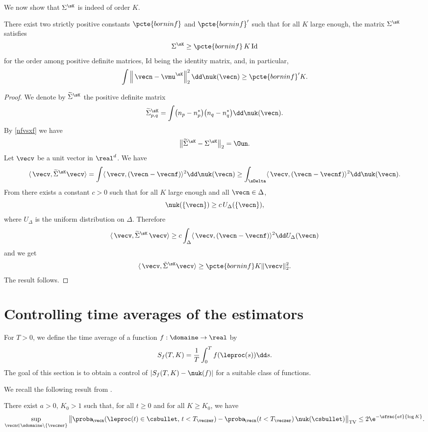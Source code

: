 We now show that $\Sigma^{\sK}$ is indeed of order $K$.
\begin{proposition}\label{borninf}
There exist two strictly positive constants $\pcte{borninf}$ and $\pcte{borninf}'$ such that for all $K$ large enough, the matrix $\Sigma^{\sK}$ satisfies
\[
\Sigma^{\sK}\ge \pcte{borninf} \, K \, \mathrm{Id}
\]
for the order among positive definite matrices, $\mathrm{Id}$ being the identity matrix, and, in particular,
\[
\int \left\|\,\vecn-\vmu^{\sK}\right\|_{2}^2\dd\nuk(\vecn)
\geq \pcte{borninf}' K.
\]
\end{proposition}
\begin{proof}
We denote by $\widetilde\Sigma^{\sK}$ the positive definite matrix
\[
\widetilde\Sigma^{\sK}_{p,q}= \int \bigl(n_{p}-n_{p}^*\bigr)
\bigl(n_{q}-n_{q}^*\bigr)\dd\nuk(\vecn).
\]
By \eqref{nfvsxf} we have
\begin{equation}\label{comparaisondescov}
\big\|\widetilde\Sigma^{\sK}-\Sigma^{\sK}\big\|_{2}=\Oun.
\end{equation}
Let $\vecv$ be a unit vector in $\real^{d}$. We have
\[
\langle\, \vecv,\widetilde\Sigma^{\sK}\vecv\rangle=
\int \langle\, \vecv,(\vecn-\vecnf)\rangle^2\dd\nuk(\vecn)\ge
\int_{\sDelta}\langle\, \vecv,(\vecn-\vecnf)\rangle^2\dd\nuk(\vecn).
\]
From \cite[Lem.\,5.3]{ccm2} there exists a constant $c>0$ such that for all $K$ large enough and all $\vecn\in \Delta$,
\[
{\nuk}(\{\vecn\})\geq c\, U_{\Delta}(\{\vecn\}),
\]
where $U_{\Delta}$ is the uniform distribution on $\Delta$.
Therefore
\[
\langle\, \vecv, \widetilde\Sigma^{\sK}\,\vecv\rangle\ge
c \int_{\Delta} \langle\, \vecv,(\vecn-\vecnf)\rangle^2
\dd U_{\Delta}(\vecn)
\]
and we get
\[
\langle\, \vecv,\tilde\Sigma^{\sK}\vecv\rangle\geq \pcte{borninf} K\|\vecv\|_{2}^2.
\]
The result follows.
\end{proof}

\section{Controlling time averages of the estimators}
\label{sec:process}

For $T>0$, we define the time average of a function $f:\domaine\to\real$ by
\begin{equation}
\label{statf}
S_{f}(T,K)=\frac{1}{T}\int_{0}^{T}f(\leproc(s)) \dd s.
\end{equation}
The goal of this section is to obtain a control of $|S_{f}(T,K)-\nuk(f)|$ for a suitable class of functions.

We recall the following result from \cite[Th.\,3.1]{ccm2}.
\begin{theorem}\label{decor-thm}
There exist $a>0$, $K_0>1$ such that, for all
$t\geq 0$ and for all $K\geq K_0$, we have
\begin{equation}\label{decor}
\sup_{\vecn\in\sdomaine\backslash\{\veczer\}}
\big\| \proba\!_{\vecn}(\leproc(t)\in \csbullet ,\, t< T_{\veczer}) -\proba\!_{\vecn}(t< T_{\veczer})
\,\nuk(\csbullet)\big\|_{{ \mathrm{TV}}} \leq 2\e^{-\sfrac{at}{\log K}}.
\end{equation}
\end{theorem}

